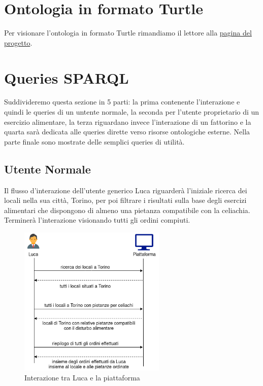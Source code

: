 \documentclass[12pt]{article}
\begin{document}
\section{Ontologia in formato Turtle}
Per visionare l'ontologia in formato Turtle rimandiamo il lettore alla \href{https://lorenzosciandra.github.io/ProgettoModSem/}{pagina del progetto}.

\section{Queries SPARQL}
Suddivideremo questa sezione in 5 parti: la prima contenente l'interazione e quindi le queries di un untente normale, la seconda per l'utente proprietario di un esercizio alimentare, la terza riguardano invece l'interazione di un fattorino e la quarta sarà dedicata alle queries dirette verso risorse ontologiche esterne.
Nella parte finale sono mostrate delle semplici queries di utilità.

\subsection{Utente Normale}
Il flusso d'interazione dell'utente generico Luca riguarderà l'iniziale ricerca dei locali nella sua città, Torino, per poi filtrare i risultati sulla base degli esercizi alimentari che dispongono di almeno una pietanza compatibile con la celiachia. Terminerà l'interazione visionando tutti gli ordini compiuti.
\begin{figure}[H]
    \centering
         \includegraphics[width=7cm]{files/lucaInterazione.png}
    \caption{Interazione tra Luca e la piattaforma}
\end{figure}
\end{document}
